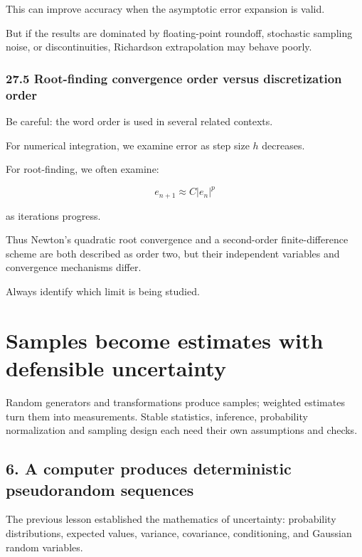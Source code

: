 This can improve accuracy when the asymptotic error expansion is valid.

But if the results are dominated by floating-point roundoff, stochastic sampling noise, or discontinuities, Richardson extrapolation may behave poorly.

\subsection{27.5 Root-finding convergence order versus discretization order}\label{02-foundations-ii-ch029-root-finding-convergence-order-versus-discretization-order}

Be careful: the word order is used in several related contexts.

For numerical integration, we examine error as step size \(h\) decreases.

For root-finding, we often examine:

\[ e_{n+1}\approx C|e_n|^p \]

as iterations progress.

Thus Newton's quadratic root convergence and a second-order finite-difference scheme are both described as order two, but their independent variables and convergence mechanisms differ.

Always identify which limit is being studied.

\chapter{Samples become estimates with defensible uncertainty}\label{02-foundations-ii-ch029-samples-become-estimates-with-defensible-uncertainty}

Random generators and transformations produce samples; weighted estimates turn them into measurements. Stable statistics, inference, probability normalization and sampling design each need their own assumptions and checks.

\section{6. A computer produces deterministic pseudorandom sequences}\label{02-foundations-ii-ch029-a-computer-produces-deterministic-pseudorandom-sequences}

The previous lesson established the mathematics of uncertainty: probability distributions, expected values, variance, covariance, conditioning, and Gaussian random variables.

